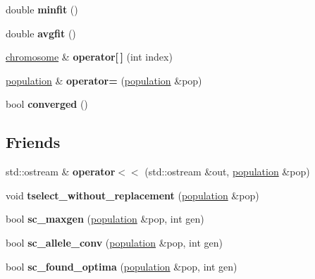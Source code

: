 \begin{DoxyCompactItemize}
\item 
\hypertarget{classpopulation_a1742b77e46f3958915a585b649c6b3c3}{double {\bfseries minfit} ()}\label{classpopulation_a1742b77e46f3958915a585b649c6b3c3}

\item 
\hypertarget{classpopulation_a2c17900a8ccdd253cb9d0e42005ed8f3}{double {\bfseries avgfit} ()}\label{classpopulation_a2c17900a8ccdd253cb9d0e42005ed8f3}

\item 
\hypertarget{classpopulation_ac84a01be0844afbc95ccfce805e7f828}{\hyperlink{classchromosome}{chromosome} \& {\bfseries operator\mbox{[}$\,$\mbox{]}} (int index)}\label{classpopulation_ac84a01be0844afbc95ccfce805e7f828}

\item 
\hypertarget{classpopulation_a927b19cad29f8b1128ac2a94de92d222}{\hyperlink{classpopulation}{population} \& {\bfseries operator=} (\hyperlink{classpopulation}{population} \&pop)}\label{classpopulation_a927b19cad29f8b1128ac2a94de92d222}

\item 
\hypertarget{classpopulation_af6b11220b65e2a0513bd257d284610d6}{bool {\bfseries converged} ()}\label{classpopulation_af6b11220b65e2a0513bd257d284610d6}

\end{DoxyCompactItemize}
\subsection*{\-Friends}
\begin{DoxyCompactItemize}
\item 
\hypertarget{classpopulation_a03e71d574a50ab016f6133bf1619a505}{std\-::ostream \& {\bfseries operator$<$$<$} (std\-::ostream \&out, \hyperlink{classpopulation}{population} \&pop)}\label{classpopulation_a03e71d574a50ab016f6133bf1619a505}

\item 
\hypertarget{classpopulation_ad6c634aba792b90d0fc6a1372880bdcd}{void {\bfseries tselect\-\_\-without\-\_\-replacement} (\hyperlink{classpopulation}{population} \&pop)}\label{classpopulation_ad6c634aba792b90d0fc6a1372880bdcd}

\item 
\hypertarget{classpopulation_a35fe1e50f9d1cc8dbb218145ee5113cc}{bool {\bfseries sc\-\_\-maxgen} (\hyperlink{classpopulation}{population} \&pop, int gen)}\label{classpopulation_a35fe1e50f9d1cc8dbb218145ee5113cc}

\item 
\hypertarget{classpopulation_af13ca088972e66fbd22d9e716924f860}{bool {\bfseries sc\-\_\-allele\-\_\-conv} (\hyperlink{classpopulation}{population} \&pop, int gen)}\label{classpopulation_af13ca088972e66fbd22d9e716924f860}

\item 
\hypertarget{classpopulation_aedb57fe814192d23e82a00f77c22e3c4}{bool {\bfseries sc\-\_\-found\-\_\-optima} (\hyperlink{classpopulation}{population} \&pop, int gen)}\label{classpopulation_aedb57fe814192d23e82a00f77c22e3c4}

\end{DoxyCompactItemize}


